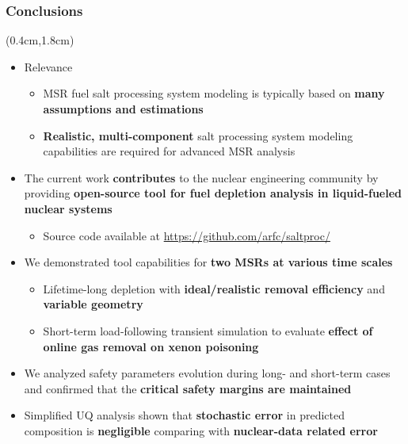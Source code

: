 \begin{frame}
\frametitle{Conclusions}
\begin{textblock*}{12cm}(0.4cm,1.8cm) %
	\begin{itemize}
		\itemsep1em
		\item Relevance
		\begin{itemize}
			\itemsep0.5em
			\item MSR fuel salt processing system modeling is typically based 
			on \textbf{many assumptions and estimations}
			\item \textbf{Realistic, multi-component} salt 
			processing system modeling capabilities are required for advanced 
			\gls{MSR} analysis
		\end{itemize} 
		\item The current work \textbf{contributes} to the nuclear engineering 
		community by providing \textbf{open-source tool for fuel depletion 
		analysis in liquid-fueled nuclear systems}
			\begin{itemize}
			\itemsep0.5em
			\item Source code available at 
			\url{https://github.com/arfc/saltproc/}
			\end{itemize}
		\item We demonstrated tool capabilities for \textbf{two MSRs at 
		various time scales}
		\begin{itemize}
			\itemsep0.5em
			\item Lifetime-long depletion with \textbf{ideal/realistic removal 
			efficiency} and \textbf{variable geometry}
			\item Short-term load-following transient simulation to 
			evaluate \textbf{effect of online gas removal on xenon poisoning}
		\end{itemize}
		\item We analyzed safety parameters evolution during long- 
		and short-term cases and confirmed that the \textbf{critical safety 
		margins are maintained}
		\item Simplified UQ analysis shown that \textbf{stochastic error} in 
		predicted composition is \textbf{negligible} comparing with 
		\textbf{nuclear-data related error}
	\end{itemize}
\end{textblock*}
\end{frame}

